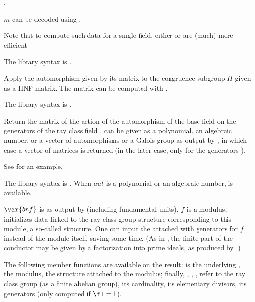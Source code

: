 .

\noindent $m$ can be decoded using .

Note that to compute such data for a single field, either 
or  are (much) more efficient.

The library syntax is .

\label{se:bnrgaloisapply}
Apply the automorphism given by its matrix  to the congruence
subgroup $H$ given as a HNF matrix.
The matrix  can be computed with .

The library syntax is .

\label{se:bnrgaloismatrix}
Return the matrix of the action of the automorphism  of the base
field  on the generators of the ray class field .
 can be given as a polynomial, an algebraic number, or a vector of
automorphisms or a Galois group as output by , in which case a
vector of matrices is returned (in the later case, only for the generators
).

See  for an example.

The library syntax is .
When $aut$ is a polynomial or an algebraic number,
 is available.

\label{se:bnrinit}
$\var{bnf}$ is as
output by  (including fundamental units), $f$ is a modulus,
initializes data linked to the ray class group structure corresponding to
this module, a so-called  structure. One can input the attached
 with generators for $f$ instead of the module itself, saving some
time. (As in , the finite part of the conductor may be given
by a factorization into prime ideals, as produced by .)

The following member functions are available
on the result:  is the underlying ,
 the modulus,  the  structure attached to the
modulus; finally, , , ,  refer to the
ray class group (as a finite abelian group), its cardinality, its elementary
divisors, its generators (only computed if $\fl = 1$).

